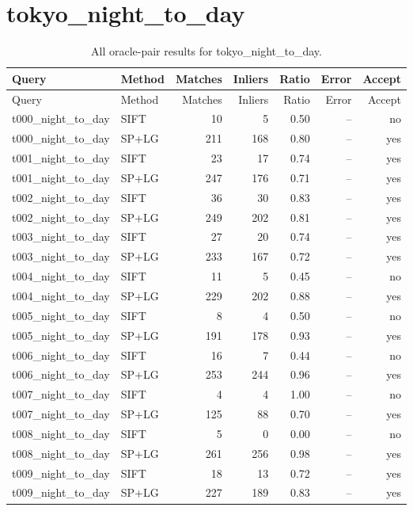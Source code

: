 \section{tokyo\_night\_to\_day}
\begingroup\scriptsize\setlength{\tabcolsep}{3pt}
\begin{longtable}{llrrrrr}
\caption{All oracle-pair results for tokyo\_night\_to\_day.}\\
\toprule
Query & Method & Matches & Inliers & Ratio & Error & Accept\\\midrule\endfirsthead
\toprule Query & Method & Matches & Inliers & Ratio & Error & Accept\\\midrule\endhead
\bottomrule\endfoot
t000\_night\_to\_day & SIFT & 10 & 5 & 0.50 & -- & no \\
t000\_night\_to\_day & SP+LG & 211 & 168 & 0.80 & -- & yes \\
t001\_night\_to\_day & SIFT & 23 & 17 & 0.74 & -- & yes \\
t001\_night\_to\_day & SP+LG & 247 & 176 & 0.71 & -- & yes \\
t002\_night\_to\_day & SIFT & 36 & 30 & 0.83 & -- & yes \\
t002\_night\_to\_day & SP+LG & 249 & 202 & 0.81 & -- & yes \\
t003\_night\_to\_day & SIFT & 27 & 20 & 0.74 & -- & yes \\
t003\_night\_to\_day & SP+LG & 233 & 167 & 0.72 & -- & yes \\
t004\_night\_to\_day & SIFT & 11 & 5 & 0.45 & -- & no \\
t004\_night\_to\_day & SP+LG & 229 & 202 & 0.88 & -- & yes \\
t005\_night\_to\_day & SIFT & 8 & 4 & 0.50 & -- & no \\
t005\_night\_to\_day & SP+LG & 191 & 178 & 0.93 & -- & yes \\
t006\_night\_to\_day & SIFT & 16 & 7 & 0.44 & -- & no \\
t006\_night\_to\_day & SP+LG & 253 & 244 & 0.96 & -- & yes \\
t007\_night\_to\_day & SIFT & 4 & 4 & 1.00 & -- & no \\
t007\_night\_to\_day & SP+LG & 125 & 88 & 0.70 & -- & yes \\
t008\_night\_to\_day & SIFT & 5 & 0 & 0.00 & -- & no \\
t008\_night\_to\_day & SP+LG & 261 & 256 & 0.98 & -- & yes \\
t009\_night\_to\_day & SIFT & 18 & 13 & 0.72 & -- & yes \\
t009\_night\_to\_day & SP+LG & 227 & 189 & 0.83 & -- & yes \\

\end{longtable}
